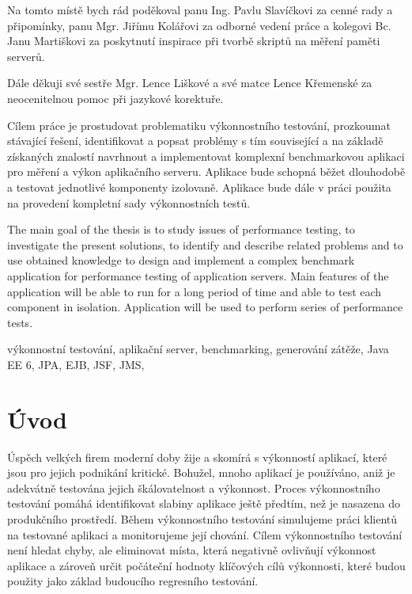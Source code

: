 \documentclass[122pt,oneside]{fithesis}
\begin{document}
\FrontMatter
\ThesisTitlePage

\begin{ThesisDeclaration}
\DeclarationText
\AdvisorName
\end{ThesisDeclaration}

\begin{ThesisThanks}
Na tomto místě bych rád poděkoval panu Ing. Pavlu Slavíčkovi za cenné rady a připomínky, panu Mgr. Jiřímu Kolářovi za odborné vedení práce a kolegovi Bc. Janu Martiškovi za poskytnutí inspirace při tvorbě skriptů na měření paměti serverů.

Dále děkuji své sestře Mgr. Lence Liškové a své matce Lence Křemenské za neocenitelnou pomoc při jazykové korektuře. 
\end{ThesisThanks}

\begin{ThesisAbstract}
Cílem práce je prostudovat problematiku výkonnostního testování, prozkoumat stávající řešení, identifikovat a popsat problémy s tím související  a na základě získaných znalostí navrhnout a implementovat komplexní benchmarkovou aplikaci pro měření a výkon aplikačního serveru. Aplikace bude schopná běžet dlouhodobě a testovat jednotlivé komponenty izolovaně. Aplikace bude dále v práci použita na provedení kompletní sady výkonnostních testů.
\end{ThesisAbstract}

\begin{ThesisAbstracten}
The main goal of the thesis is to study issues of performance testing, to investigate the present solutions, to identify and describe related problems and to use obtained knowledge to design and implement a complex benchmark application for performance testing of application servers. Main features of the application will be able to run for a long period of time and able to test each component in isolation. Application will be used to perform series of performance tests.
\end{ThesisAbstracten}

\begin{ThesisKeyWords}
výkonnostní testování, aplikační server, benchmarking, generování zátěže, Java EE 6, JPA, EJB, JSF, JMS, 
\end{ThesisKeyWords}

\MainMatter
\tableofcontents

\chapter*{Úvod}
Úspěch velkých firem moderní doby žije a skomírá s výkonností aplikací, které jsou pro jejich podnikání kritické. Bohužel, mnoho aplikací je používáno, aniž je adekvátně testována jejich škálovatelnost a výkonnost. Proces výkonnostního testování pomáhá identifikovat slabiny aplikace ještě předtím, než je nasazena do produkčního prostředí. Během výkonnostního testování simulujeme práci klientů na testované aplikaci a monitorujeme její chování. Cílem výkonnostního testování není hledat chyby, ale eliminovat místa, která negativně ovlivňují výkonnost aplikace a zároveň určit počáteční hodnoty klíčových cílů výkonnosti, které budou použity jako základ budoucího regresního testování.
\end{document}
